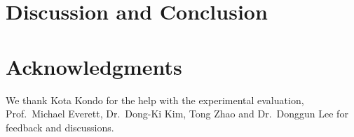\documentclass[letterpaper, 10 pt, journal, twoside]{IEEEtran}
\begin{document}
\section{Discussion and Conclusion} \label{sec:conclusion}


\section{Acknowledgments}
We thank Kota Kondo for the help with the experimental evaluation, Prof.\ Michael Everett,  Dr.\ Dong-Ki Kim, Tong Zhao and Dr.\ Donggun Lee for feedback and discussions.


\end{document}
